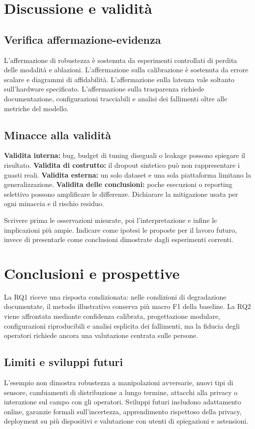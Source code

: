 \chapter{Discussione e validità}\label{ch:m-discussion}
\section{Verifica affermazione-evidenza}
L'affermazione di robustezza è sostenuta da esperimenti controllati di perdita delle modalità e ablazioni. L'affermazione sulla calibrazione è sostenuta da errore scalare e diagrammi di affidabilità. L'affermazione sulla latenza vale soltanto sull'hardware specificato. L'affermazione sulla trasparenza richiede documentazione, configurazioni tracciabili e analisi dei fallimenti oltre alle metriche del modello.

\section{Minacce alla validità}
\textbf{Validita interna:} bug, budget di tuning diseguali o leakage possono spiegare il risultato. \textbf{Validita di costrutto:} il dropout sintetico può non rappresentare i guasti reali. \textbf{Validita esterna:} un solo dataset e una sola piattaforma limitano la generalizzazione. \textbf{Validita delle conclusioni:} poche esecuzioni o reporting selettivo possono amplificare le differenze. Dichiarare la mitigazione usata per ogni minaccia e il rischio residuo.

\begin{keypoint}
Scrivere prima le osservazioni misurate, poi l'interpretazione e infine le implicazioni più ampie. Indicare come ipotesi le proposte per il lavoro futuro, invece di presentarle come conclusioni dimostrate dagli esperimenti correnti.
\end{keypoint}

\chapter{Conclusioni e prospettive}
La RQ1 riceve una risposta condizionata: nelle condizioni di degradazione documentate, il metodo illustrativo conserva più macro F1 della baseline. La RQ2 viene affrontata mediante confidenza calibrata, progettazione modulare, configurazioni riproducibili e analisi esplicita dei fallimenti, ma la fiducia degli operatori richiede ancora una valutazione centrata sulle persone.

\section{Limiti e sviluppi futuri}
L'esempio non dimostra robustezza a manipolazioni avversarie, nuovi tipi di sensore, cambiamenti di distribuzione a lungo termine, attacchi alla privacy o interazione sul campo con gli operatori. Sviluppi futuri includono adattamento online, garanzie formali sull'incertezza, apprendimento rispettoso della privacy, deployment su più dispositivi e valutazione con utenti di spiegazioni e astensioni.
